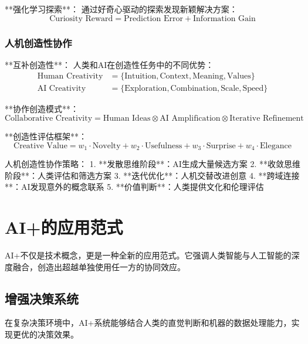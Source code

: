 **强化学习探索**：
通过好奇心驱动的探索发现新颖解决方案：
\begin{equation}
\text{Curiosity Reward} = \text{Prediction Error} + \text{Information Gain}
\end{equation}

\subsubsection{人机创造性协作} %

**互补创造性**：
人类和AI在创造性任务中的不同优势：
\begin{align}
\text{Human Creativity} &= \{\text{Intuition}, \text{Context}, \text{Meaning}, \text{Values}\} \\
\text{AI Creativity} &= \{\text{Exploration}, \text{Combination}, \text{Scale}, \text{Speed}\}
\end{align}

**协作创造模式**：
\begin{equation}
\text{Collaborative Creativity} = \text{Human Ideas} \otimes \text{AI Amplification} \otimes \text{Iterative Refinement}
\end{equation}

**创造性评估框架**：
\begin{equation}
\text{Creative Value} = w_1 \cdot \text{Novelty} + w_2 \cdot \text{Usefulness} + w_3 \cdot \text{Surprise} + w_4 \cdot \text{Elegance}
\end{equation}

\begin{center}
人机创造性协作策略：
1. **发散思维阶段**：AI生成大量候选方案
2. **收敛思维阶段**：人类评估和筛选方案
3. **迭代优化**：人机交替改进创意
4. **跨域连接**：AI发现意外的概念联系
5. **价值判断**：人类提供文化和伦理评估
\end{center}

\section{AI+的应用范式}

AI+不仅是技术概念，更是一种全新的应用范式。它强调人类智能与人工智能的深度融合，创造出超越单独使用任一方的协同效应。

\subsection{增强决策系统}

在复杂决策环境中，AI+系统能够结合人类的直觉判断和机器的数据处理能力，实现更优的决策效果。

